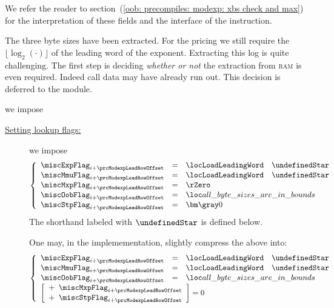	We refer the reader to section~(\ref{oob: precompiles: modexp: xbs check and max}) for the interpretation of these fields and the interface of the \oobInstModexpXbs{} instruction. 

	The three byte sizes have been extracted.
	For the pricing we still require the $\lfloor\log_{2}(\cdot)\rfloor$ of the leading word of the exponent.
	Extracting this log is quite challenging.
	The first step is deciding \emph{whether or not} the extraction from \textsc{ram} is even required.
	Indeed call data may have already run out.
	This decision is deferred to the \oobMod{} module.
	\begin{description}
		\def\rowNum{\yellowm{5}} \item[\underline{\underline{Miscellaneous row $n^°(i + \prcModexpLeadRowOffset)$:}}] we impose 
			\begin{description}
				\item[\underline{Setting lookup flags:}]
					we impose
					\[
						\left\{ \begin{array}{lclr}
							\miscExpFlag _{i + \prcModexpLeadRowOffset} & = & \locLoadLeadingWord \quad \undefinedStar \\
							\miscMmuFlag _{i + \prcModexpLeadRowOffset} & = & \locLoadLeadingWord \quad \undefinedStar \\
							\miscMxpFlag _{i + \prcModexpLeadRowOffset} & = & \rZero                                   \\
							\miscOobFlag _{i + \prcModexpLeadRowOffset} & = & \locAllByteSizesAreInBounds              \\
							\miscStpFlag _{i + \prcModexpLeadRowOffset} & = & \gZero                                   \\
						\end{array} \right.
					\]
					\saNote{}
					The shorthand \locLoadLeadingWord{} labeled with $\undefinedStar$ is defined below.

					\saNote{}
					One may, in the implemementation, slightly compress the above into:
					\[
						\left\{ \begin{array}{lclr}
							\miscExpFlag _{i + \prcModexpLeadRowOffset} & = & \locLoadLeadingWord \quad \undefinedStar \\
							\miscMmuFlag _{i + \prcModexpLeadRowOffset} & = & \locLoadLeadingWord \quad \undefinedStar \\
							\miscOobFlag _{i + \prcModexpLeadRowOffset} & = & \locAllByteSizesAreInBounds              \\
							\multicolumn{3}{l}{
								\left[ \begin{array}{cl}
									+\!\!\! & \miscMxpFlag _{i + \prcModexpLeadRowOffset} \\
									+\!\!\! & \miscStpFlag _{i + \prcModexpLeadRowOffset} \\
								\end{array} \right] = 0} \\
						\end{array} \right.
					\]


\end{description}
\end{description}

